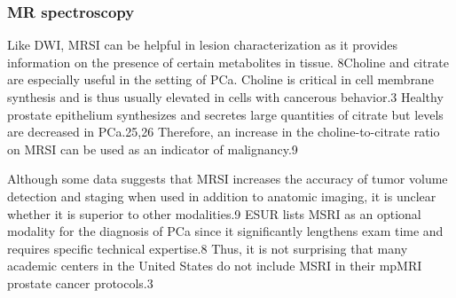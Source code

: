 \subsubsection{MR spectroscopy}
Like DWI, MRSI can be helpful in lesion characterization as it provides information on the presence of certain metabolites in tissue. 8Choline and citrate are especially useful in the setting of PCa. Choline is critical in cell membrane synthesis and is thus usually elevated in cells with cancerous behavior.3 Healthy prostate epithelium synthesizes and secretes large quantities of citrate but levels are decreased in PCa.25,26 Therefore, an increase in the choline-to-citrate ratio on MRSI can be used as an indicator of malignancy.9 

Although some data suggests that MRSI increases the accuracy of tumor volume detection and staging when used in addition to anatomic imaging, it is unclear whether it is superior to other modalities.9 ESUR lists MSRI as an optional modality for the diagnosis of PCa since it significantly lengthens exam time and requires specific technical expertise.8 Thus, it is not surprising that many academic centers in the United States do not include MSRI in their mpMRI prostate cancer protocols.3
